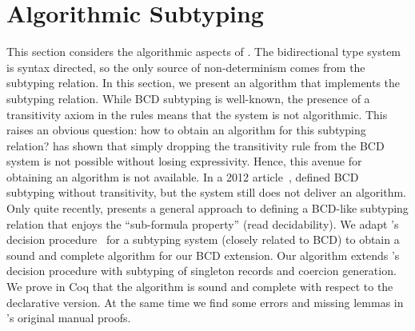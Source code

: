 
\section{Algorithmic Subtyping}
\label{sec:alg}

This section considers the algorithmic aspects of \namee. The bidirectional type
system is syntax directed, so the only source of non-determinism comes from the
subtyping relation. In this section, we present an algorithm that implements the
subtyping relation. While BCD subtyping is well-known, the presence of a
transitivity axiom in the rules means that the system is not algorithmic. This
raises an obvious question: how to obtain an algorithm for this subtyping
relation? \citet{Laurent12note} has shown that simply dropping the transitivity
rule from the BCD system is not possible without losing expressivity. Hence,
this avenue for obtaining an algorithm is not available. In a 2012
article~\citep{laurent2012intersection}, \citeauthor{laurent2012intersection}
defined BCD subtyping without transitivity, but the system still does not
deliver an algorithm. Only quite recently, \citet{Laurent18b} presents a general
approach to defining a BCD-like subtyping relation that enjoys the
``sub-formula property'' (read decidability).
We adapt \citeauthor{pierce1989decision}'s decision
procedure~\citep{pierce1989decision} for a subtyping system (closely
related to BCD) to obtain a sound and complete algorithm for our
BCD extension. Our algorithm extends \citeauthor{pierce1989decision}'s decision
procedure with subtyping of singleton records and
coercion generation. We prove in Coq that the algorithm is sound and complete with
respect to the declarative version. At the same time we
find some errors and missing lemmas in \citeauthor{pierce1989decision}'s original manual proofs.




